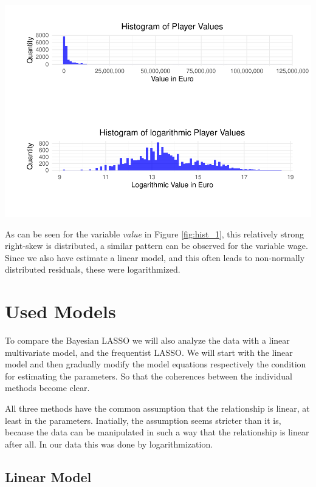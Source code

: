 \documentclass[12pt,a4paper]{article}
\let\origfigure\figure
\let\endorigfigure\endfigure
\renewenvironment{figure}[1][2] {
    \expandafter\origfigure\expandafter[H]
} {
    \endorigfigure
}
\begin{document}
\begin{figure}
\centering
\includegraphics{term_paper_bayes_files/figure-latex/fig1-1.pdf}
\caption{\label{fig:hist_1} Histograms of player values and log player
values}
\end{figure}

As can be seen for the variable \emph{value} in Figure \ref{fig:hist_1},
this relatively strong right-skew is distributed, a similar pattern can
be observed for the variable wage. Since we also have estimate a linear
model, and this often leads to non-normally distributed residuals, these
were logarithmized.

\newpage

\hypertarget{used-models}{%
\section{Used Models}\label{used-models}}

To compare the Bayesian \ac{LASSO} we will also analyze the data with a
linear multivariate model, and the frequentist \ac{LASSO}. We will start
with the linear model and then gradually modify the model equations
respectively the condition for estimating the parameters. So that the
coherences between the individual methods become clear.

All three methods have the common assumption that the relationship is
linear, at least in the parameters. Inatially, the assumption seems
stricter than it is, because the data can be manipulated in such a way
that the relationship is linear after all. In our data this was done by
logarithmization.

\hypertarget{linear-model}{%
\subsection{Linear Model}\label{linear-model}}
\end{document}
